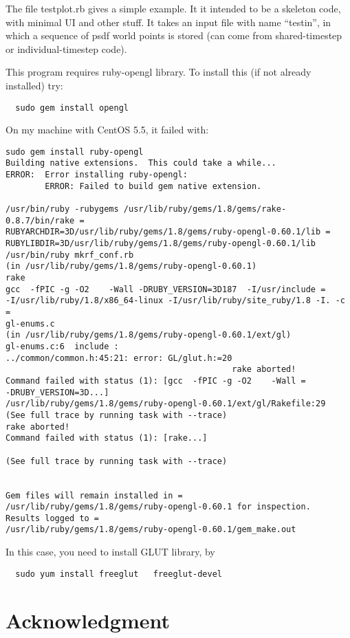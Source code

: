 \documentclass[5p,authoryear]{elsarticle}
\begin{document}
The file testplot.rb gives a simple example. It it intended to be a
skeleton code, with minimal UI and other stuff. It takes an input file
with name ``testin'', in which a sequence of psdf world points is
stored (can come from shared-timestep or individual-timestep code).

This program requires ruby-opengl library. To install this (if not
already installed) try:
\begin{verbatim}
  sudo gem install opengl
\end{verbatim}
On my machine with CentOS 5.5, it failed with:
\begin{verbatim}
sudo gem install ruby-opengl
Building native extensions.  This could take a while...
ERROR:  Error installing ruby-opengl:
        ERROR: Failed to build gem native extension.

/usr/bin/ruby -rubygems /usr/lib/ruby/gems/1.8/gems/rake-0.8.7/bin/rake =
RUBYARCHDIR=3D/usr/lib/ruby/gems/1.8/gems/ruby-opengl-0.60.1/lib =
RUBYLIBDIR=3D/usr/lib/ruby/gems/1.8/gems/ruby-opengl-0.60.1/lib
/usr/bin/ruby mkrf_conf.rb
(in /usr/lib/ruby/gems/1.8/gems/ruby-opengl-0.60.1)
rake
gcc  -fPIC -g -O2    -Wall -DRUBY_VERSION=3D187  -I/usr/include =
-I/usr/lib/ruby/1.8/x86_64-linux -I/usr/lib/ruby/site_ruby/1.8 -I. -c =
gl-enums.c
(in /usr/lib/ruby/gems/1.8/gems/ruby-opengl-0.60.1/ext/gl)
gl-enums.c:6  include :
../common/common.h:45:21: error: GL/glut.h:=20
                                              rake aborted!
Command failed with status (1): [gcc  -fPIC -g -O2    -Wall =
-DRUBY_VERSION=3D...]
/usr/lib/ruby/gems/1.8/gems/ruby-opengl-0.60.1/ext/gl/Rakefile:29
(See full trace by running task with --trace)
rake aborted!
Command failed with status (1): [rake...]

(See full trace by running task with --trace)


Gem files will remain installed in =
/usr/lib/ruby/gems/1.8/gems/ruby-opengl-0.60.1 for inspection.
Results logged to =
/usr/lib/ruby/gems/1.8/gems/ruby-opengl-0.60.1/gem_make.out
\end{verbatim}

In this case, you need to install GLUT library, by
\begin{verbatim}
  sudo yum install freeglut   freeglut-devel
\end{verbatim}

\section*{Acknowledgment}



\end{document}
